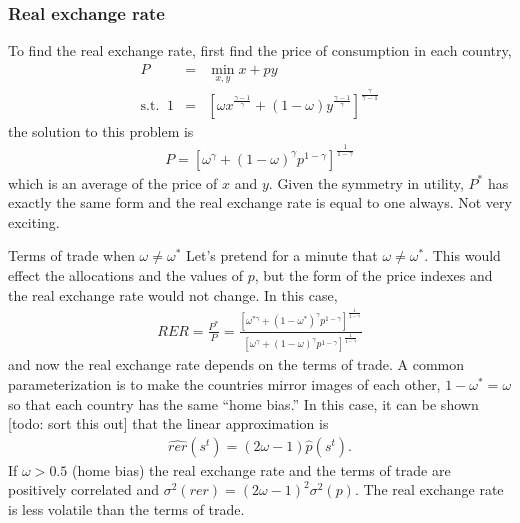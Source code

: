 \documentclass[11pt,pdftex,twoside,letterpaper]{exam}
\begin{document}
 \subsubsection{Real exchange rate}
 To find the real exchange rate, first find the price of consumption in each country,
 \begin{eqnarray}
   P&=&\min_{x,y} x+py\\
    \textrm{s.t.} \;\; 1 &=& \left[ \omega x^{\frac{\gamma-1}{\gamma}} + (1-\omega)y^\frac{\gamma-1}{\gamma} \right]^{\frac{\gamma}{\gamma-1}}
 \end{eqnarray}
 the solution to this problem is
 \begin{eqnarray}
   P =\left[\omega^\gamma+(1-\omega)^\gamma p^{1-\gamma}\right]^\frac{1}{1-\gamma}
 \end{eqnarray}
 which is an average of the price of $x$ and $y$. Given the symmetry in utility, $P^*$ has exactly the same form and the real exchange rate is equal to one always. Not very exciting.

\begin{mybox}{Terms of trade when $\omega \neq \omega^*$}
      Let's pretend for a minute that $\omega \neq \omega^*$. This would effect the allocations and the values of $p$, but the form of the price indexes and the real exchange rate would not change. In this case,
      \begin{eqnarray}
        RER = \frac{P^*}{P} = \frac{\left[\omega^{*\gamma}+(1-\omega^*)^\gamma p^{1-\gamma}\right]^\frac{1}{1-\gamma}}{\left[\omega^\gamma+(1-\omega)^\gamma p^{1-\gamma}\right]^\frac{1}{1-\gamma}}
      \end{eqnarray}
      and now the real exchange rate depends on the terms of trade. A common parameterization is to make the countries mirror images of each other, $1-\omega^*=\omega$ so that each country has the same ``home bias.'' In this case, it can be shown [todo: sort this out] that the linear approximation is
      \begin{eqnarray}
        \widehat{rer}(s^t) = (2\omega-1)\widehat{p}(s^t).
      \end{eqnarray}
      If $\omega>0.5$ (home bias)  the real exchange rate and the terms of trade are positively correlated and $\sigma^2(rer) = (2\omega-1)^2\sigma^2(p)$.  The real exchange rate is less volatile than the terms of trade.
 \end{mybox}
\end{document}
